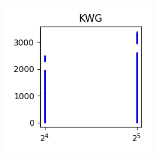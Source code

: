 \documentclass[sigconf,authorversion]{acmart}
\begin{document}
\begin{figure}[hbtp]
\begin{subfigure}[b]{0.3\textwidth}
        \label{fig:nwg}
    \end{subfigure}
    \begin{subfigure}[b]{0.3\textwidth}
        \includegraphics[width=\textwidth]{img/KWG.png}
        \label{fig:kwg}
    \end{subfigure}
\end{figure}
\end{document}
